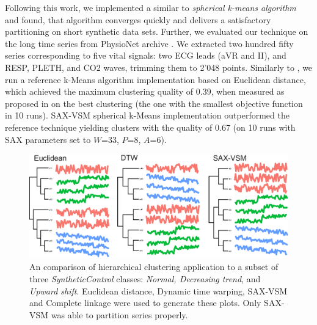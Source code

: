 Following this work, we implemented a similar to \cite{citeulike:1172599} \textit{spherical k-means algorithm}
and found, that algorithm converges quickly and delivers a satisfactory partitioning on short
synthetic data sets. Further, we evaluated our technique on the long time series from PhysioNet 
archive \cite{citeulike:699487}. 
We extracted two hundred fifty series corresponding to five vital signals: two ECG leads 
(aVR and II), and RESP, PLETH, and CO2 waves, trimming them to 2'048 points. Similarly to
\cite{citeulike:10525778}, we run a reference k-Means algorithm implementation based on Euclidean
distance, which achieved the maximum clustering quality of 0.39, when measured as proposed in
\cite{citeulike:1325189} on the best clustering (the one with the smallest objective function in 10 runs). 
SAX-VSM spherical k-Means implementation outperformed the reference technique yielding 
clusters  with the quality of 0.67 (on 10 runs with SAX parameters set to 
$W$=33, $P$=8, $A$=6).


\begin{figure}[t]
   \centering
   \includegraphics[width=140mm]{figures/clustering.eps}
   \caption{An comparison of hierarchical clustering application to a subset of three
   \textit{SyntheticControl} classes: \textit{Normal, Decreasing trend}, and \textit{Upward shift}. 
   Euclidean distance, Dynamic time warping, SAX-VSM and Complete linkage were used to 
   generate these plots. Only SAX-VSM was able to partition series properly.                       
   }
   \label{fig:hc}
\end{figure}

